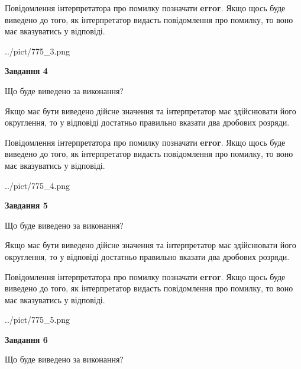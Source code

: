 \documentclass[12pt, ukrainian]{article}
\begin{document}
{\begin {Large}
Повідомлення інтерпретатора про помилку позначати \textbf{error}.
Якщо щось буде виведено до того, як інтерпретатор видасть повідомлення про помилку, 
то воно має вказуватись у відповіді. \par

\begin{center}
	{../pict/775_3.png}
\end{center}
\newpage

{\begin {center}\textbf{Завдання 4}\end {center}}\par
Що буде виведено за виконання? \par

Якщо має бути виведено дійсне значення та інтерпретатор має здійснювати його округлення, 
то у відповіді достатньо правильно вказати два дробових розряди.

Повідомлення інтерпретатора про помилку позначати \textbf{error}.
Якщо щось буде виведено до того, як інтерпретатор видасть повідомлення про помилку, 
то воно має вказуватись у відповіді. \par

\begin{center}
	{../pict/775_4.png}
\end{center}
\newpage

{\begin {center}\textbf{Завдання 5}\end {center}}\par
Що буде виведено за виконання? \par

Якщо має бути виведено дійсне значення та інтерпретатор має здійснювати його округлення, 
то у відповіді достатньо правильно вказати два дробових розряди.

Повідомлення інтерпретатора про помилку позначати \textbf{error}.
Якщо щось буде виведено до того, як інтерпретатор видасть повідомлення про помилку, 
то воно має вказуватись у відповіді. \par

\begin{center}
	{../pict/775_5.png}
\end{center}
\newpage

{\begin {center}\textbf{Завдання 6}\end {center}}\par
Що буде виведено за виконання? \par


\end{Large}}
\end{document}

